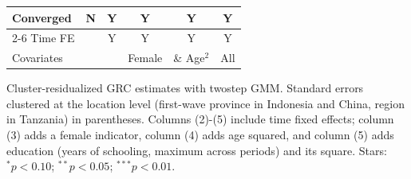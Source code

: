 \begin{table}[htbp]
\begin{threeparttable}
\begin{tabular}{l ccccc}
Converged           &           N   &           Y   &           Y   &           Y   &           Y   \\
\cmidrule{2-6} Time FE & & Y & Y & Y & Y \\ Covariates & & & Female & \& Age$^2$ & All \\ \bottomrule \end{tabular} \begin{tablenotes}[flushleft] \footnotesize \item{Cluster-residualized GRC estimates with twostep GMM. Standard errors clustered at the location level (first-wave province in Indonesia and China, region in Tanzania) in parentheses. Columns (2)-(5) include time fixed effects; column (3) adds a female indicator, column (4) adds age squared, and column (5) adds education (years of schooling, maximum across periods) and its square. Stars: $^{*} p<0.10$; $^{**} p<0.05$; $^{***} p<0.01$.} \end{tablenotes} \end{threeparttable} \end{table}
